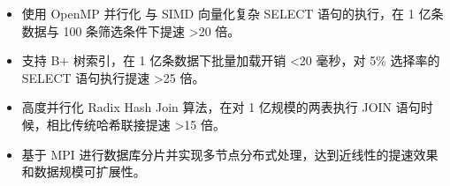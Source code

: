 


\begin{itemize}[nosep]
  \item 使用 OpenMP 并行化 与 SIMD 向量化复杂 SELECT 语句的执行，在 1 亿条数据与 100 条筛选条件下提速 >20 倍。
  \item 支持 B+ 树索引，在 1 亿条数据下批量加载开销 <20 毫秒，对 5\% 选择率的 SELECT 语句执行提速 >25 倍。
  \item 高度并行化 Radix Hash Join 算法，在对 1 亿规模的两表执行 JOIN 语句时候，相比传统哈希联接提速 >15 倍。
  \item 基于 MPI 进行数据库分片并实现多节点分布式处理，达到近线性的提速效果和数据规模可扩展性。
\end{itemize}
